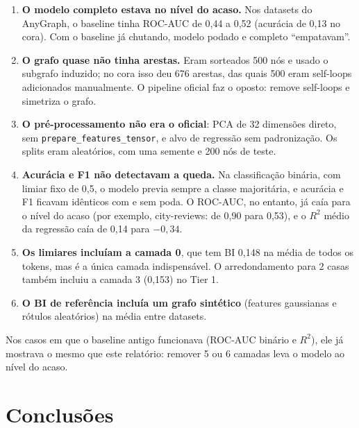 \documentclass[11pt,a4paper]{article}
\begin{document}
\begin{enumerate}
  \item \textbf{O modelo completo estava no nível do acaso.} Nos datasets do AnyGraph, o baseline tinha ROC-AUC de 0,44 a 0,52 (acurácia de 0,13 no cora). Com o baseline já chutando, modelo podado e completo ``empatavam''.
  \item \textbf{O grafo quase não tinha arestas.} Eram sorteados 500 nós e usado o subgrafo induzido; no cora isso deu 676 arestas, das quais 500 eram self-loops adicionados manualmente. O pipeline oficial faz o oposto: remove self-loops e simetriza o grafo.
  \item \textbf{O pré-processamento não era o oficial}: PCA de 32 dimensões direto, sem \texttt{prepare\_features\_tensor}, e alvo de regressão sem padronização. Os splits eram aleatórios, com uma semente e 200 nós de teste.
  \item \textbf{Acurácia e F1 não detectavam a queda.} Na classificação binária, com limiar fixo de 0,5, o modelo previa sempre a classe majoritária, e acurácia e F1 ficavam idênticos com e sem poda. O ROC-AUC, no entanto, já caía para o nível do acaso (por exemplo, city-reviews: de 0,90 para 0,53), e o $R^2$ médio da regressão caía de 0,14 para $-0{,}34$.
  \item \textbf{Os limiares incluíam a camada 0}, que tem BI 0,148 na média de todos os tokens, mas é a única camada indispensável. O arredondamento para 2 casas também incluiu a camada 3 (0,153) no Tier 1.
  \item \textbf{O BI de referência incluía um grafo sintético} (features gaussianas e rótulos aleatórios) na média entre datasets.
\end{enumerate}

Nos casos em que o baseline antigo funcionava (ROC-AUC binário e $R^2$), ele já mostrava o mesmo que este relatório: remover 5 ou 6 camadas leva o modelo ao nível do acaso.

\section{Conclusões}
\end{document}
